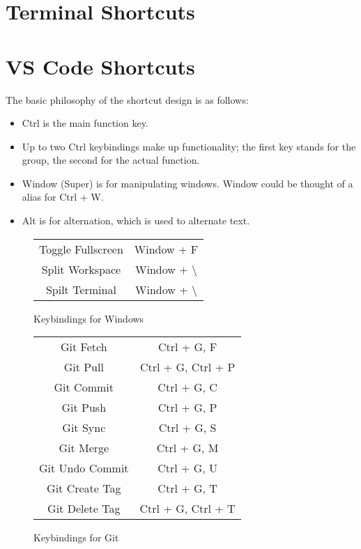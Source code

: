 \documentclass[10pt]{article}
\begin{document}
\section{Terminal Shortcuts} \label{S_Terminal}


\section{VS Code Shortcuts} \label{S_VSCode}
	The basic philosophy of the shortcut design is as follows:

	\begin{itemize}
		\item Ctrl is the main function key.
		\item Up to two Ctrl keybindings make up functionality; the first key stands for the group, the second for the actual function.
		\item Window (Super) is for manipulating windows. Window could be thought of a alias for Ctrl + W.
		\item Alt is for alternation, which is used to alternate text.
	\end{itemize}

	\begin{figure}[H]
		\centering
		\begin{tabular}{@{}c c@{}}
			\toprule

			Toggle Fullscreen & Window + F \\
			Split Workspace & Window + \textbackslash \\
			Spilt Terminal & Window + \textbackslash \\

			\bottomrule
		\end{tabular}
		\caption{Keybindings for Windows}
	\end{figure}

	\begin{figure}[H]
		\centering
		\begin{tabular}{@{}c c@{}}
			\toprule

			Git Fetch & Ctrl + G, F \\
			Git Pull & Ctrl + G, Ctrl + P \\
			Git Commit & Ctrl + G, C \\
			Git Push & Ctrl + G, P \\
			Git Sync & Ctrl + G, S \\
			Git Merge & Ctrl + G, M \\
			Git Undo Commit & Ctrl + G, U \\
			Git Create Tag & Ctrl + G, T \\
			Git Delete Tag & Ctrl + G, Ctrl + T \\

			\bottomrule
		\end{tabular}
		\caption{Keybindings for Git}
	\end{figure}
\end{document}
